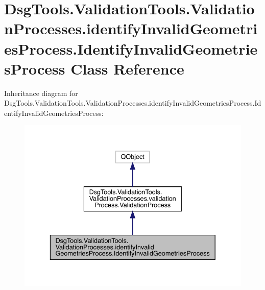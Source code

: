 \hypertarget{class_dsg_tools_1_1_validation_tools_1_1_validation_processes_1_1identify_invalid_geometries_pro5fada1db0a6bcf351a3763e9c36b27ae}{}\section{Dsg\+Tools.\+Validation\+Tools.\+Validation\+Processes.\+identify\+Invalid\+Geometries\+Process.\+Identify\+Invalid\+Geometries\+Process Class Reference}
\label{class_dsg_tools_1_1_validation_tools_1_1_validation_processes_1_1identify_invalid_geometries_pro5fada1db0a6bcf351a3763e9c36b27ae}


Inheritance diagram for Dsg\+Tools.\+Validation\+Tools.\+Validation\+Processes.\+identify\+Invalid\+Geometries\+Process.\+Identify\+Invalid\+Geometries\+Process\+:
\nopagebreak
\begin{figure}[H]
\begin{center}
\leavevmode
\includegraphics[width=336pt]{class_dsg_tools_1_1_validation_tools_1_1_validation_processes_1_1identify_invalid_geometries_pro14cb405e824a988aff4c5914905d321c}
\end{center}
\end{figure}


